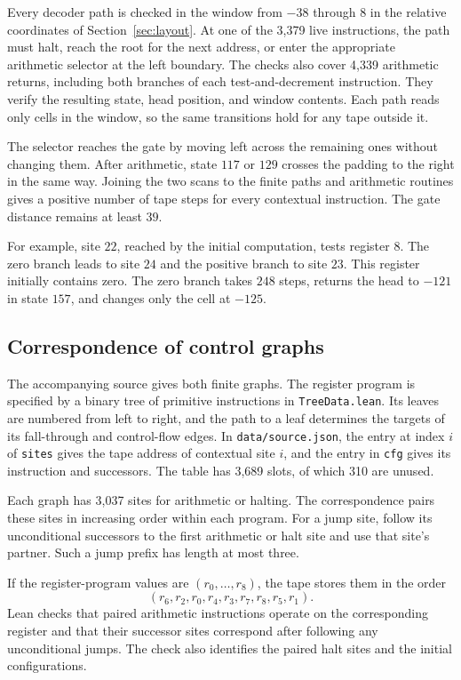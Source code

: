 \documentclass[11pt,letterpaper]{article}
\newcommand{\file}[1]{\nolinkurl{#1}}
\begin{document}
Every decoder path is checked in the window from $-38$ through $8$
in the relative coordinates of Section~\ref{sec:layout}. At one of
the 3,379 live instructions, the path must halt, reach the root for
the next address, or enter the appropriate arithmetic selector at
the left boundary. The checks also cover 4,339 arithmetic returns,
including both branches of each test-and-decrement instruction.
They verify the resulting state, head position, and window contents.
Each path reads only cells in the window, so the same transitions
hold for any tape outside it.

The selector reaches the gate by moving left across the remaining
ones without changing them. After arithmetic, state $117$ or $129$
crosses the padding to the right in the same way. Joining the two
scans to the finite paths and arithmetic routines gives a positive
number of tape steps for every contextual instruction. The gate
distance remains at least $39$.

For example, site $22$, reached by the initial computation, tests
register $8$. The zero branch leads to site $24$ and the positive
branch to site $23$. This register initially contains zero.
The zero branch takes $248$ steps, returns the head to $-121$ in
state $157$, and changes only the cell at $-125$.

\subsection{Correspondence of control graphs}

The accompanying source gives both finite graphs. The register
program is specified by a binary tree of primitive instructions
in \file{TreeData.lean}. Its leaves are numbered from left to right,
and the path to a leaf determines the targets of its fall-through
and control-flow edges. In \file{data/source.json}, the entry at
index $i$ of \file{sites} gives the tape address of contextual site
$i$, and the entry in \file{cfg} gives its instruction and successors.
The table has 3,689 slots, of which 310 are unused.

Each graph has 3,037 sites for arithmetic or halting. The correspondence pairs these sites in increasing order
within each program. For a jump site, follow its unconditional
successors to the first arithmetic or halt site and use that
site's partner. Such a jump prefix has length at most three.

If the register-program values are $(r_0,\ldots,r_8)$, the tape
stores them in the order
\[
  (r_6,r_2,r_0,r_4,r_3,r_7,r_8,r_5,r_1).
\]
Lean checks that paired arithmetic instructions operate on the
corresponding register
and that their successor sites correspond after following any
unconditional jumps. The check also identifies the paired halt
sites and the initial configurations.
\end{document}
